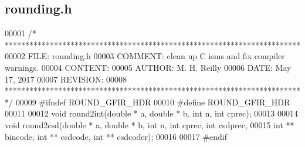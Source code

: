 \subsection{rounding.\+h}
\label{rounding_8h_source}

\begin{DoxyCode}
00001 \textcolor{comment}{/* ************************************************************************ }
00002 \textcolor{comment}{   FILE:    rounding.h}
00003 \textcolor{comment}{   COMMENT: clean up C isms and fix compiler warnings. }
00004 \textcolor{comment}{   CONTENT:}
00005 \textcolor{comment}{   AUTHOR:  M. H. Reilly }
00006 \textcolor{comment}{   DATE:    May 17, 2017}
00007 \textcolor{comment}{   REVISION:}
00008 \textcolor{comment}{   ************************************************************************ */}
00009 \textcolor{preprocessor}{#ifndef ROUND\_GFIR\_HDR}
00010 \textcolor{preprocessor}{#define ROUND\_GFIR\_HDR}
00011 
00012 \textcolor{keywordtype}{void} round2int(\textcolor{keywordtype}{double} * a, \textcolor{keywordtype}{double} * b, \textcolor{keywordtype}{int} n, \textcolor{keywordtype}{int} cprec); 
00013 
00014 \textcolor{keywordtype}{void} round2csd(\textcolor{keywordtype}{double} * a, \textcolor{keywordtype}{double} * b, \textcolor{keywordtype}{int} n, \textcolor{keywordtype}{int} cprec, \textcolor{keywordtype}{int} csdprec, 
00015            \textcolor{keywordtype}{int} ** bincode, \textcolor{keywordtype}{int} ** csdcode, \textcolor{keywordtype}{int} ** csdcoder);
00016 
00017 \textcolor{preprocessor}{#endif}
\end{DoxyCode}
